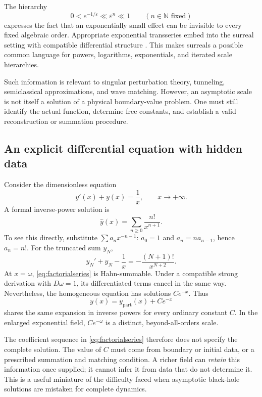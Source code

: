 \documentclass[11pt,letterpaper]{article}
\newcommand{\N}{\mathbb{N}}
\newcommand{\eps}{\varepsilon}
\theoremstyle{definition}
\theoremstyle{remark}
\begin{document}
The hierarchy
\[
 0<e^{-1/\eps}\ll\eps^n\ll1
 \qquad(n\in\N\text{ fixed})
\]
expresses the fact that an exponentially small effect can be invisible to every
fixed algebraic order. Appropriate exponential transseries embed into the
surreal setting with compatible differential structure
\cite{BerarducciMantova,ADH}. This makes surreals a possible common language for
powers, logarithms, exponentials, and iterated scale hierarchies.

Such information is relevant to singular perturbation theory, tunneling,
semiclassical approximations, and wave matching. However, an asymptotic scale
is not itself a solution of a physical boundary-value problem. One must still
identify the actual function, determine free constants, and establish a valid
reconstruction or summation procedure.

\subsection{An explicit differential equation with hidden data}

Consider the dimensionless equation
\begin{equation}
 y'(x)+y(x)=\frac1x,
 \qquad x\to+\infty.
 \label{eq:factorialODE}
\end{equation}
A formal inverse-power solution is
\begin{equation}
 \widehat y(x)=\sum_{n\geq0}\frac{n!}{x^{n+1}}.
 \label{eq:factorialseries}
\end{equation}
To see this directly, substitute $\sum a_nx^{-n-1}$: $a_0=1$ and
$a_n=n a_{n-1}$, hence $a_n=n!$. For the truncated sum $y_N$,
\begin{equation}
 y_N'+y_N-\frac1x=-\frac{(N+1)!}{x^{N+2}}.
 \label{eq:factorialresidual}
\end{equation}
At $x=\omega$, \eqref{eq:factorialseries} is Hahn-summable. Under a compatible
strong derivation with $D\omega=1$, its differentiated terms cancel in the same
way. Nevertheless, the homogeneous equation has solutions $Ce^{-x}$. Thus
\begin{equation}
 y(x)=y_{\mathrm{part}}(x)+Ce^{-x}
 \label{eq:ambiguity}
\end{equation}
shares the same expansion in inverse powers for every ordinary constant $C$.
In the enlarged exponential field, $Ce^{-\omega}$ is a distinct,
beyond-all-orders scale.

The coefficient sequence in \eqref{eq:factorialseries} therefore does not
specify the complete solution. The value of $C$ must come from boundary or
initial data, or a prescribed summation and matching condition. A richer field
can \emph{retain} this information once supplied; it cannot infer it from data
that do not determine it. This is a useful miniature of the difficulty faced
when asymptotic black-hole solutions are mistaken for complete dynamics.
\end{document}

